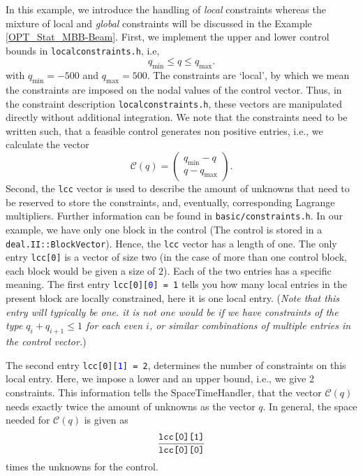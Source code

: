 In this example, we introduce the handling of \textit{local} constraints
whereas the mixture of local and \textit{global} constraints will be discussed
in the Example \ref{OPT_Stat_MBB-Beam}. 
%
First, we implement the upper and lower control bounds in 
\texttt{localconstraints.h}, i.e,
\[
q_{\min} \leq q \leq q_{\max}.
\]
with $q_{\min} = -500$ and $q_{\max} = 500$.
The constraints are `local', by which we mean the constraints are imposed 
on the nodal values of the control vector. Thus, in the constraint 
description \texttt{localconstraints.h},
these vectors are manipulated directly without additional integration. We 
note that the constraints need to be written such, that a feasible control
generates non positive entries, i.e., we 
calculate the vector
\[
 \mathcal C(q) = \begin{pmatrix}
   q_{\min} - q\\q-q_{\max}
 \end{pmatrix}.
 \]
%
Second, the \texttt{lcc} vector is used to describe the amount of unknowns that 
need to be reserved to store the constraints, and, eventually, corresponding 
Lagrange multipliers. 
Further information can be found in \texttt{basic/constraints.h}. 
In our example, we have only one block in the control (The control is stored in 
a \texttt{deal.II::BlockVector}). Hence, the \texttt{lcc} vector has a length of 
one. 
The only entry \texttt{lcc[0]} is a vector of size two (in the case of more than one 
control block, each block would be given a size of $2$). 
Each of the two entries has a specific meaning. 
The first entry \texttt{lcc[0][\textcolor{blue}{0}] = 1} tells 
you how many local entries in the present block are locally constrained, here 
it is one local entry. ({\em Note that this entry will typically be one. 
it is not one  would be if we have constraints of the type $q_{i} + q_{i+1} \le 1$ for each 
even $i$, or similar combinations of multiple entries in the control vector.})

The second entry \texttt{lcc[0][\textcolor{blue}{1}] = 2}, determines the number of 
constraints on this local entry. Here, we impose 
a lower and an upper bound, i.e., we give 2 constraints.
This information tells the SpaceTimeHandler, that the vector 
$\mathcal C(q)$ needs exactly twice the amount of unknowns as the vector $q$.
In general, the space needed for $\mathcal C(q)$ is given as 
\[
\frac{\text{\texttt{lcc[0][1]}}}{\text{\texttt{lcc[0][0]}}}
\]
times the unknowns for the control.

